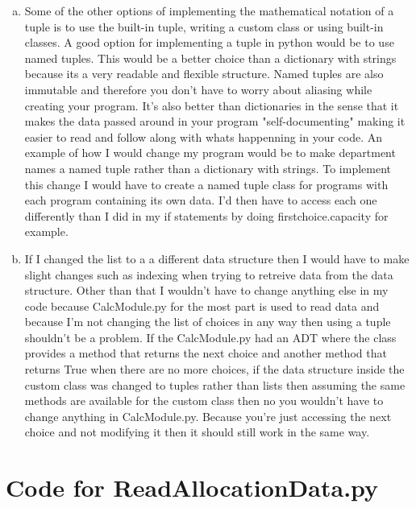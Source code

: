 \documentclass[12pt]{article}
\begin{document}
\begin{enumerate}[(a)]
\item Some of the other options of implementing the mathematical notation of a tuple is to use the built-in tuple, writing a custom class or using built-in classes. A good option for implementing a tuple in python would be to use named tuples. This would be a better choice than a dictionary with strings because its a very readable and flexible structure. Named tuples are also immutable and therefore you don't have to worry about aliasing while creating your program. It's also better than dictionaries in the sense that it makes the data passed around in your program "self-documenting" making it easier to read and follow along with whats happenning in your code. An example of how I would change my program would be to make department names a named tuple rather than a dictionary with strings. To implement this change I would have to create a named tuple class for programs with each program containing its own data. I'd then have to access each one differently than I did in my if statements by doing firstchoice.capacity for example. 

\item If I changed the list to a a different data structure then I would have to make slight changes such as indexing when trying to retreive data from the data structure. Other than that I wouldn't have to change anything else in my code because CalcModule.py for the most part is used to read data and because I'm not changing the list of choices in any way then using a tuple shouldn't be a problem. If the CalcModule.py had an ADT where the class provides a method that returns the next choice and another method that returns True when there are no more choices, if the data structure inside the custom class was changed to tuples rather than lists then assuming the same methods are available for the custom class then no you wouldn't have to change anything in CalcModule.py. Because you're just accessing the next choice and not modifying it then it should still work in the same way.
\end{enumerate}

\newpage

\lstset{language=Python, basicstyle=\tiny, breaklines=true, showspaces=false,
  showstringspaces=false, breakatwhitespace=true}

\def\thesection{\Alph{section}}

\section{Code for ReadAllocationData.py}
\end{document}
